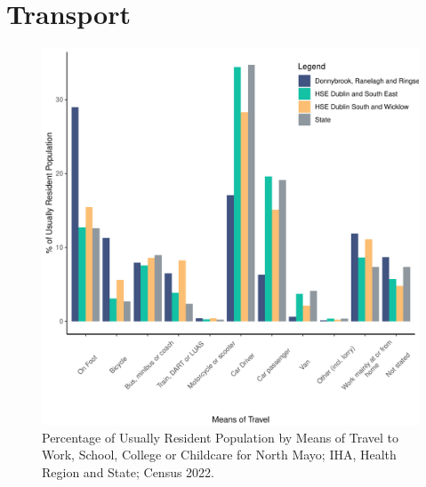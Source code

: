 \documentclass{article}
\begin{document}
\section{Transport}\label{sect:Trans}
\begin{figure}[H]
	\centering
	\includegraphics[width = 120mm]{../figures/TravelED.pdf}
	\caption{Percentage of Usually Resident Population by Means of Travel to Work, School, College or Childcare for North Mayo; IHA, Health Region and State; Census 2022.}
	\label{fig:vbnv}
	\end{figure}
\end{document}
